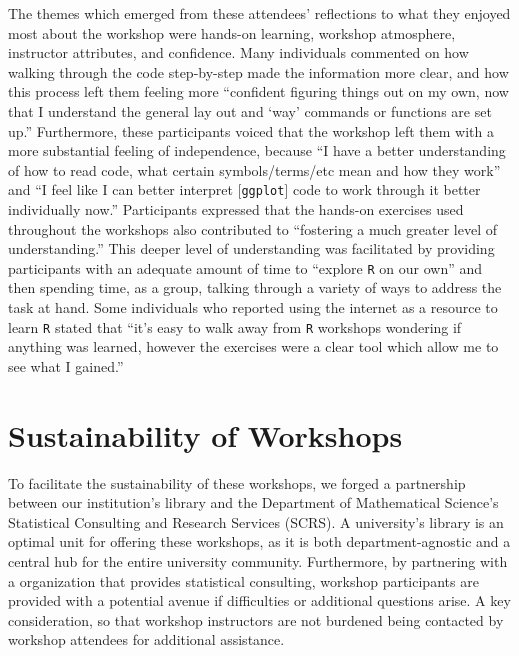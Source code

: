 \documentclass[12pt]{article}
\begin{document}
\quad The themes which emerged from these attendees' reflections to what they 
enjoyed most about the workshop were hands-on learning, workshop atmosphere,
instructor attributes, and confidence. Many individuals commented on how walking
through the code step-by-step made the information more clear, and how this
process left them feeling more ``confident figuring things out on my own, now 
that I understand the general lay out and `way' commands or functions are set
up.'' Furthermore, these participants voiced that the workshop left them with a
more substantial feeling of independence, because ``I have a better
understanding of how to read code, what certain symbols/terms/etc mean and how
they work'' and ``I feel like I can better interpret [\texttt{ggplot}] code to
work through it better individually now.'' Participants expressed that the
hands-on exercises used throughout the workshops also contributed to 
``fostering a much greater level of understanding.'' This deeper level of
understanding was facilitated by providing participants with an adequate
amount of time to ``explore \texttt{R} on our own'' and then spending time, as a
group, talking through a variety of ways to address the task at hand. Some
individuals who reported using the internet as a resource to learn \texttt{R}
stated that ``it's easy to walk away from \texttt{R} workshops wondering if
anything was learned, however the exercises were a clear tool which allow me to
see what I gained.''  

\section{Sustainability of Workshops}  
\label{sec:sustainability}

\quad To facilitate the sustainability of these workshops, we forged a
partnership between our institution's library and the Department of Mathematical
Science's Statistical Consulting and Research Services (SCRS). A university's
library is an optimal unit for offering these workshops, as it is both
department-agnostic and a central hub for the entire university community.
Furthermore, by partnering with a organization that provides statistical
consulting, workshop participants are provided with a potential avenue if
difficulties or additional questions arise. A key consideration, so that 
workshop instructors are not burdened being contacted by workshop attendees for 
additional assistance. 
\end{document}

